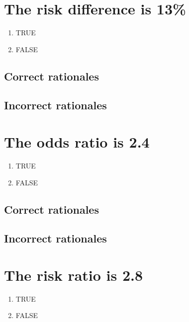 \documentclass[letterpaper,9pt,twoside,printwatermark=false]{pinp}
\providecommand{\tightlist}{%
  \setlength{\itemsep}{0pt}\setlength{\parskip}{0pt}}
\begin{document}
\section{The risk difference is 13\%}\label{the-risk-difference-is-13}

\begin{enumerate}
\def\labelenumi{\alph{enumi}.}
\tightlist
\item
  TRUE
\item
  FALSE
\end{enumerate}

\subsection{Correct rationales}\label{correct-rationales}

\subsection{Incorrect rationales}\label{incorrect-rationales}

\section{The odds ratio is 2.4}\label{the-odds-ratio-is-2.4}

\begin{enumerate}
\def\labelenumi{\alph{enumi}.}
\tightlist
\item
  TRUE
\item
  FALSE
\end{enumerate}

\subsection{Correct rationales}\label{correct-rationales-1}

\subsection{Incorrect rationales}\label{incorrect-rationales-1}

\section{The risk ratio is 2.8}\label{the-risk-ratio-is-2.8}

\begin{enumerate}
\def\labelenumi{\alph{enumi}.}
\tightlist
\item
  TRUE
\item
  FALSE
\end{enumerate}
\end{document}
